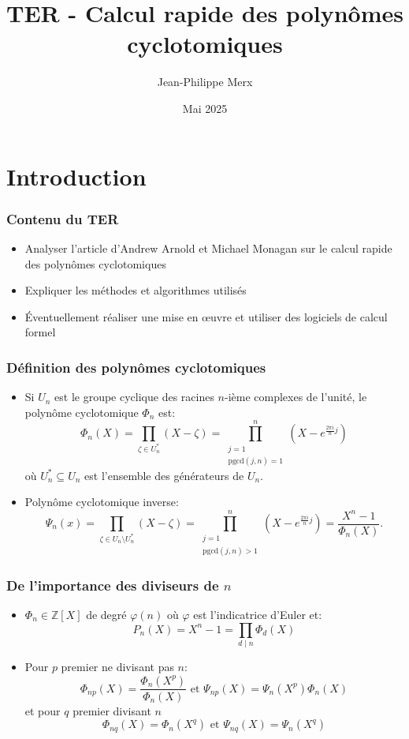 \documentclass{beamer}
\title{TER - Calcul rapide des polynômes cyclotomiques}
\author{Jean-Philippe Merx}
\institute{M1 Mathématiques - Sorbonne Université}
\date{Mai 2025}
\newcommand{\pgcd}{\mathrm{pgcd}}
\begin{document}
	
	\frame{\titlepage}
	
	
	\newtheorem{theoreme}{Théorème}
	\newtheorem{proposition}{Proposition}
	
	\section{Introduction}
	
	\begin{frame}
		\frametitle{Contenu du TER}
		\begin{itemize}
			\item Analyser l'article d'Andrew Arnold et Michael Monagan sur le calcul rapide des polynômes cyclotomiques
			\item Expliquer les méthodes et algorithmes utilisés
			\item Éventuellement réaliser une mise en œuvre et utiliser des logiciels de calcul formel
		\end{itemize}
	\end{frame}
	
	\begin{frame}
		\frametitle{Définition des polynômes cyclotomiques}
		\begin{itemize}
			\item Si $U_n$ est le groupe cyclique des racines $n$-ième complexes de l'unité, le polynôme cyclotomique $\Phi_n$ est:
			$$\Phi_n(X) = \prod_{\zeta \in U^*_n} (X - \zeta) = \prod_{\substack{j=1\\ \pgcd(j,n)=1}}^n (X - e^{\frac{2 \pi i}{n}j})$$ où $U_n^* \subseteq U_n$ est l'ensemble des générateurs de $U_n$.
			\item Polynôme cyclotomique inverse:
			$$\Psi_n(x) = \prod_{\zeta \in U_n \setminus U^*_n} (X - \zeta) = \prod_{\substack{j=1\\ \pgcd(j,n) > 1}}^n (X - e^{\frac{2 \pi i}{n}j}) = \frac{X^n - 1}{\Phi_n(X)}.$$
		\end{itemize}
	\end{frame}
	
	\begin{frame}
		\frametitle{De l'importance des diviseurs de $n$}
		\begin{itemize}
			\item $\Phi_n \in \mathbb Z[X]$ de degré $\varphi(n)$ où $\varphi$ est l'indicatrice d'Euler et:
			$$P_n(X) = X^n-1 = \prod_{ d \mid n} \Phi_d(X)$$
			\item Pour $p$ premier ne divisant pas $n$:
			$$\Phi_{np}(X) = \frac{\Phi_n(X^p)}{\Phi_n(X)} \text{ et } \Psi_{np}(X) = \Psi_n(X^p)\Phi_n(X)$$
			et pour $q$ premier divisant $n$
			$$\Phi_{nq}(X) = \Phi_n(X^q) \text{ et } \Psi_{nq}(X) = \Psi_n(X^q)$$
		\end{itemize}
	\end{frame}
\end{document}
